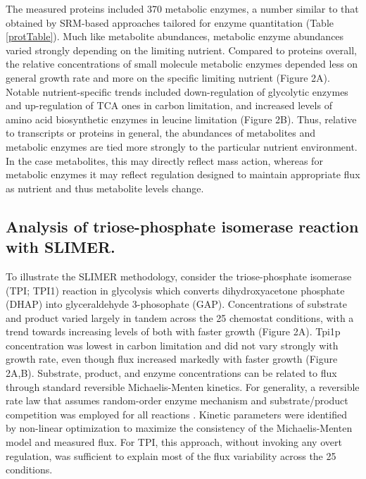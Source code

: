 The measured proteins included 370 metabolic enzymes, a number similar to that obtained by SRM-based approaches tailored for enzyme quantitation \cite{Costenoble:2011hia, Zampar:2013fr} (Table \ref{protTable}). Much like metabolite abundances, metabolic enzyme abundances varied strongly depending on the limiting nutrient. Compared to proteins overall, the relative concentrations of small molecule metabolic enzymes depended less on general growth rate and more on the specific limiting nutrient (Figure 2A). Notable nutrient-specific trends included down-regulation of glycolytic enzymes and up-regulation of TCA ones in carbon limitation, and increased levels of amino acid biosynthetic enzymes in leucine limitation (Figure 2B). Thus, relative to transcripts or proteins in general, the abundances of metabolites and metabolic enzymes are tied more strongly to the particular nutrient environment. In the case metabolites, this may directly reflect mass action, whereas for metabolic enzymes it may reflect regulation designed to maintain appropriate flux as nutrient and thus metabolite levels change.

\subsection{Analysis of triose-phosphate isomerase reaction with SLIMER.}

To illustrate the SLIMER methodology, consider the triose-phosphate isomerase (TPI; TPI1) reaction in glycolysis which converts dihydroxyacetone phosphate (DHAP) into glyceraldehyde 3-phosophate (GAP). Concentrations of substrate and product varied largely in tandem across the 25 chemostat conditions, with a trend towards increasing levels of both with faster growth (Figure 2A). Tpi1p concentration was lowest in carbon limitation and did not vary strongly with growth rate, even though flux increased markedly with faster growth (Figure 2A,B). Substrate, product, and enzyme concentrations can be related to flux through standard reversible Michaelis-Menten kinetics. For generality, a reversible rate law that assumes random-order enzyme mechanism and substrate/product competition was employed for all reactions \cite{Liebermeister:2006fm, Tummler:2014cp}. Kinetic parameters were identified by non-linear optimization to maximize the consistency of the Michaelis-Menten model and measured flux. For TPI, this approach, without invoking any overt regulation, was sufficient to explain most of the flux variability across the 25 conditions.

